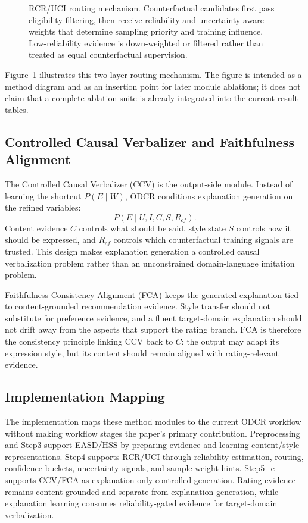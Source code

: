 \begin{figure}[t]
  \centering
  \resizebox{\textwidth}{!}{}
  \caption{RCR/UCI routing mechanism. Counterfactual candidates first pass eligibility filtering, then receive reliability and uncertainty-aware weights that determine sampling priority and training influence. Low-reliability evidence is down-weighted or filtered rather than treated as equal counterfactual supervision.}
  \label{fig:rcr_routing}
\end{figure}

Figure~\ref{fig:rcr_routing} illustrates this two-layer routing mechanism. The
figure is intended as a method diagram and as an insertion point for later
module ablations; it does not claim that a complete ablation suite is already
integrated into the current result tables.

\subsection{Controlled Causal Verbalizer and Faithfulness Alignment}

The Controlled Causal Verbalizer (CCV) is the output-side module. Instead of
learning the shortcut \(P(E\mid W)\), ODCR conditions explanation generation on
the refined variables:
\[
  P(E \mid U, I, C, S, R_{cf}) .
\]
Content evidence \(C\) controls what should be said, style state \(S\) controls
how it should be expressed, and \(R_{cf}\) controls which counterfactual
training signals are trusted. This design makes explanation generation a
controlled causal verbalization problem rather than an unconstrained
domain-language imitation problem.

Faithfulness Consistency Alignment (FCA) keeps the generated explanation tied
to content-grounded recommendation evidence. Style transfer should not
substitute for preference evidence, and a fluent target-domain explanation
should not drift away from the aspects that support the rating branch. FCA is
therefore the consistency principle linking CCV back to \(C\): the output may
adapt its expression style, but its content should remain aligned with
rating-relevant evidence.

\subsection{Implementation Mapping}

The implementation maps these method modules to the current ODCR workflow
without making workflow stages the paper's primary contribution. Preprocessing
and Step3 support EASD/HSS by preparing evidence and learning content/style
representations. Step4 supports RCR/UCI through reliability estimation,
routing, confidence buckets, uncertainty signals, and sample-weight hints.
Step5\_e supports CCV/FCA as explanation-only controlled generation. Rating
evidence remains content-grounded and separate from explanation generation,
while explanation learning consumes reliability-gated evidence for target-domain
verbalization.
